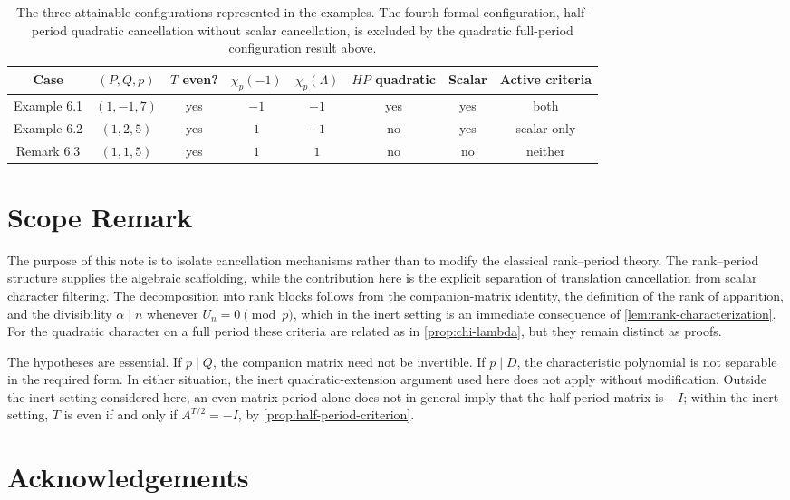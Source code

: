 \documentclass[11pt]{article}
\theoremstyle{plain}
\theoremstyle{definition}
\begin{document}
\begin{table}[ht]
\centering
\small
\begin{tabular}{c c c c c c c c}
\hline
Case & $(P,Q,p)$ & $T$ even? & $\chi_p(-1)$ & $\chi_p(\Lambda)$ & $HP$ quadratic & Scalar & Active criteria \\
\hline
Example 6.1 & $(1,-1,7)$ & yes & $-1$ & $-1$ & yes & yes & both \\
Example 6.2 & $(1,2,5)$ & yes & $1$ & $-1$ & no & yes & scalar only \\
Remark 6.3  & $(1,1,5)$ & yes & $1$ & $1$ & no & no & neither \\
\hline
\end{tabular}
\caption{The three attainable configurations represented in the examples. The fourth formal configuration, half-period quadratic cancellation without scalar cancellation, is excluded by the quadratic full-period configuration result above.}
\end{table}


\section{Scope Remark}

The purpose of this note is to isolate cancellation mechanisms rather than to modify the classical rank--period theory. The rank--period structure supplies the algebraic scaffolding, while the contribution here is the explicit separation of translation cancellation from scalar character filtering. The decomposition into rank blocks follows from the companion-matrix identity, the definition of the rank of apparition, and the divisibility $\alpha\mid n$ whenever $U_n=0\pmod p$, which in the inert setting is an immediate consequence of \cref{lem:rank-characterization}. For the quadratic character on a full period these criteria are related as in \cref{prop:chi-lambda}, but they remain distinct as proofs.

The hypotheses are essential. If $p\mid Q$, the companion matrix need not be invertible. If $p\mid D$, the characteristic polynomial is not separable in the required form. In either situation, the inert quadratic-extension argument used here does not apply without modification. Outside the inert setting considered here, an even matrix period alone does not in general imply that the half-period matrix is $-I$; within the inert setting, $T$ is even if and only if $A^{T/2}=-I$, by \cref{prop:half-period-criterion}.

\section*{Acknowledgements}
\end{document}
